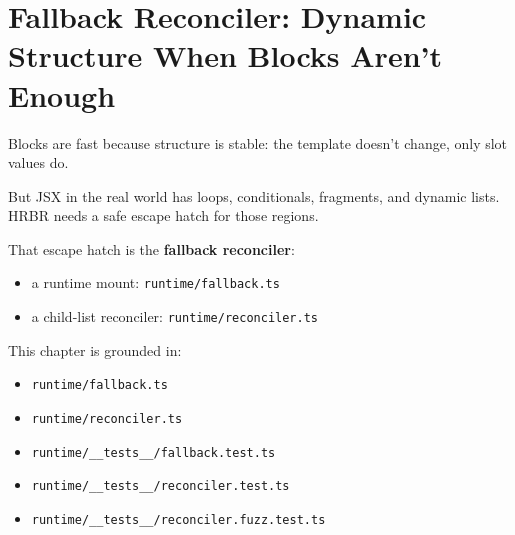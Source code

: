 \chapter{Fallback Reconciler: Dynamic Structure When Blocks Aren't Enough}
\label{ch:hrbr-fallback-reconciler}

Blocks are fast because structure is stable: the template doesn’t change, only slot values do.

But JSX in the real world has loops, conditionals, fragments, and dynamic lists.
HRBR needs a safe escape hatch for those regions.

That escape hatch is the \textbf{fallback reconciler}:

\begin{itemize}
  \item a runtime mount: \texttt{runtime/fallback.ts}
  \item a child-list reconciler: \texttt{runtime/reconciler.ts}
\end{itemize}

\begin{center}
\end{center}

This chapter is grounded in:

\begin{itemize}
  \item \texttt{runtime/fallback.ts}
  \item \texttt{runtime/reconciler.ts}
  \item \texttt{runtime/\_\_tests\_\_/fallback.test.ts}
  \item \texttt{runtime/\_\_tests\_\_/reconciler.test.ts}
  \item \texttt{runtime/\_\_tests\_\_/reconciler.fuzz.test.ts}
\end{itemize}

